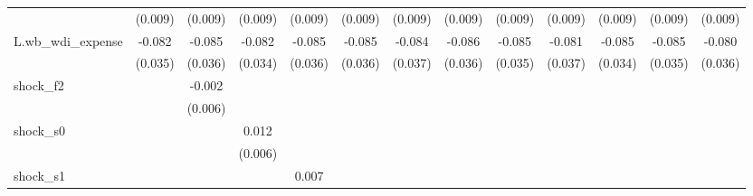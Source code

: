 {\begin{tabular}{l*{12}{c}}
            &     (0.009)         &     (0.009)         &     (0.009)         &     (0.009)         &     (0.009)         &     (0.009)         &     (0.009)         &     (0.009)         &     (0.009)         &     (0.009)         &     (0.009)         &     (0.009)         \\
\addlinespace
L.wb\_wdi\_expense&      -0.082\sym{**} &      -0.085\sym{**} &      -0.082\sym{**} &      -0.085\sym{**} &      -0.085\sym{**} &      -0.084\sym{**} &      -0.086\sym{**} &      -0.085\sym{**} &      -0.081\sym{**} &      -0.085\sym{**} &      -0.085\sym{**} &      -0.080\sym{**} \\
            &     (0.035)         &     (0.036)         &     (0.034)         &     (0.036)         &     (0.036)         &     (0.037)         &     (0.036)         &     (0.035)         &     (0.037)         &     (0.034)         &     (0.035)         &     (0.036)         \\
\addlinespace
shock\_f2    &                     &      -0.002         &                     &                     &                     &                     &                     &                     &                     &                     &                     &                     \\
            &                     &     (0.006)         &                     &                     &                     &                     &                     &                     &                     &                     &                     &                     \\
\addlinespace
shock\_s0    &                     &                     &       0.012\sym{**} &                     &                     &                     &                     &                     &                     &                     &                     &                     \\
            &                     &                     &     (0.006)         &                     &                     &                     &                     &                     &                     &                     &                     &                     \\
\addlinespace
shock\_s1    &                     &                     &                     &       0.007         &                     &                     &                     &                     &                     &                     &                     &                     \\

\end{tabular}}

